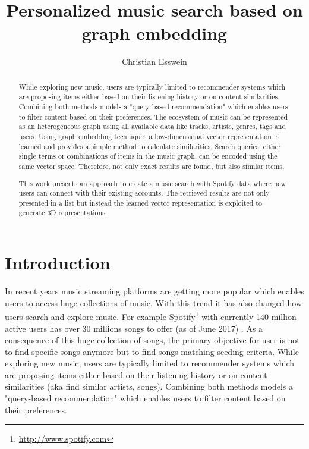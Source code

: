 \documentclass[sigconf]{acmart}
\begin{document}
\title{Personalized music search based on graph embedding}


\author{Christian Esswein}


\begin{abstract}
	While exploring new music, users are typically limited to recommender systems which are proposing items either based on their listening history or on content similarities. Combining both methods models a "query-based recommendation" which enables users to filter content based on their preferences.
	The ecosystem of music can be represented as an heterogeneous graph using all available data like tracks, artists, genres, tags and users. Using graph embedding techniques a low-dimensional vector representation is learned and provides a simple method to calculate similarities. Search queries, either single terms or combinations of items in the music graph, can be encoded using the same vector space. Therefore, not only exact results are found, but also similar items.
	
	This work presents an approach to create a music search with Spotify data where new users can connect with their existing accounts. The retrieved results are not only presented in a list but instead the learned vector representation is exploited to generate 3D representations.
\end{abstract}



\maketitle

\section{Introduction}
In recent years music streaming platforms are getting more popular which enables users to access huge collections of music. With this trend it has also changed how users search and explore music\cite{lee2016look}. For example Spotify\footnote{\url{http://www.spotify.com}} with currently 140 million active users has over 30 millions songs to offer (as of June 2017)	\cite{aboutSpotify}. As a consequence of this huge collection of songs, the primary objective for user is not to find specific songs anymore but to find songs matching seeding criteria. 
While exploring new music, users are typically limited to recommender systems which are proposing items either based on their listening history or on content similarities (aka find similar artists, songs). Combining both methods models a "query-based recommendation" which enables users to filter content based on their preferences.
\end{document}
